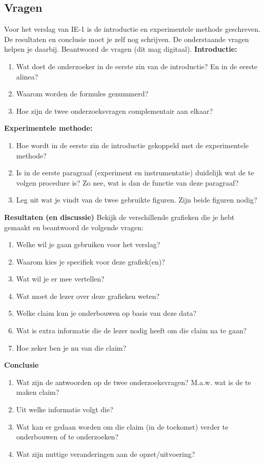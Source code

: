 \subsection{Vragen}
Voor het verslag van IE-1 is de introductie en experimentele methode geschreven. De resultaten en conclusie moet je zelf nog schrijven. De onderstaande vragen helpen je daarbij. Beantwoord de vragen (dit mag digitaal).\newline\newline
%
\textbf{Introductie:}
\begin{enumerate}
    \item Wat doet de onderzoeker in de eerste zin van de introductie? En in de eerste alinea?
    \item Waarom worden de formules genummerd?
    \item Hoe zijn de twee onderzoeksvragen complementair aan elkaar?
\end{enumerate}
%
\textbf{Experimentele methode:}
\begin{enumerate}
    \item Hoe wordt in de eerste zin de introductie gekoppeld met de experi\-mentele methode?
    \item Is in de eerste paragraaf (experiment en instrumentatie) duidelijk wat de te volgen procedure is? Zo nee, wat is dan de functie van deze paragraaf?
    \item Leg uit wat je vindt van de twee gebruikte figuren. Zijn beide figuren nodig?
\end{enumerate}
%
\textbf{Resultaten (en discussie)}
Bekijk de verschillende grafieken die je hebt gemaakt en beantwoord de volgende vragen:
\begin{enumerate}
    \item Welke wil je gaan gebruiken voor het verslag?
    \item Waarom kies je specifiek voor deze grafiek(en)?
    \item Wat wil je er mee vertellen?
    \item Wat moet de lezer over deze grafieken weten?
    \item Welke claim kun je onderbouwen op basis van deze data?
    \item Wat is extra informatie die de lezer nodig heeft om die claim na te gaan?
    \item Hoe zeker ben je nu van die claim?
\end{enumerate}
%
\textbf{Conclusie}
\begin{enumerate}
    \item Wat zijn de antwoorden op de twee onderzoeksvragen? M.a.w. wat is de te maken claim?
    \item Uit welke informatie volgt die?
    \item Wat kan er gedaan worden om die claim (in de toekomst) verder te onderbouwen of te onderzoeken?
    \item Wat zijn nuttige veranderingen aan de opzet/uitvoering?
\end{enumerate}
%

